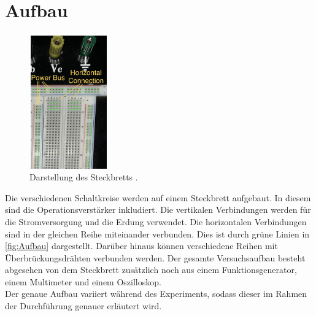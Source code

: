 \section{Aufbau}
\label{sec:Aufbau}

\begin{figure}
    \begin{center}
        \includegraphics[width=0.3\textwidth]{Aufbau.png}
        \caption{Darstellung des Steckbretts \cite{ap51}.}
        \label{fig:Aufbau}
    \end{center} 
    \end{figure}
Die verschiedenen Schaltkreise werden auf einem Steckbrett aufgebaut. In diesem sind die Operationsverstärker inkludiert. 
Die vertikalen Verbindungen werden für die Stromversorgung und die Erdung verwendet. Die horizontalen Verbindungen 
sind in der gleichen Reihe miteinander verbunden. Dies ist durch grüne Linien in \autoref{fig:Aufbau} dargestellt.
Darüber hinaus können verschiedene Reihen mit Überbrückungsdrähten verbunden werden. 
Der gesamte Versuchsaufbau besteht abgesehen von dem Steckbrett zusätzlich noch aus einem Funktionsgenerator, 
einem Multimeter und einem Oszilloskop.
\\
Der genaue Aufbau variiert während des Experiments, sodass dieser im Rahmen der Durchführung genauer erläutert wird.